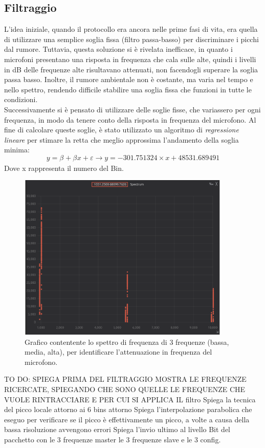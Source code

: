 \subsection{Filtraggio}
L'idea iniziale, quando il protocollo era ancora nelle prime fasi di vita, era quella di utilizzare una semplice soglia fissa (filtro passa-basso) per discriminare i picchi dal rumore.
Tuttavia, questa soluzione si è rivelata inefficace, in quanto i microfoni presentano una risposta in frequenza che cala sulle alte, quindi i livelli in dB delle frequenze alte risultavano attenuati, non facendogli superare la soglia passa basso.
Inoltre, il rumore ambientale non è costante, ma varia nel tempo e nello spettro, rendendo difficile stabilire una soglia fissa che funzioni in tutte le condizioni.\\ 
Successivamente si è pensato di utilizzare delle soglie fisse, che variassero per ogni frequenza, in modo da tenere conto della risposta in frequenza del microfono.
Al fine di calcolare queste soglie, è stato utilizzato un algoritmo di \textit{regressione lineare} per stimare la retta che meglio approssima l'andamento della soglia minima:
\[
y = \beta_{} + \beta_{}x + \varepsilon \rightarrow y = -301.751324 \times x + 48531.689491
\]
Dove x rappresenta il numero del Bin.
\begin{figure}[H]
    \centering
    \includegraphics[width=0.9\textwidth]{immagini/fft_regression_check.png}
    \caption{Grafico contentente lo spettro di frequenza di 3 frequenze (bassa, media, alta), per identificare l'attenuazione in frequenza del microfono.}
    \label{fig:spettro2}
\end{figure}


TO DO:
SPIEGA PRIMA DEL FILTRAGGIO MOSTRA LE FREQUENZE RICERCATE, SPIEGANDO CHE SONO QUELLE LE FREQUENZE CHE VUOLE RINTRACCIARE E PER CUI SI APPLICA IL filtro
Spiega la tecnica del picco locale attorno ai 6 bins attorno
Spiega l'interpolazione parabolica che eseguo per verificare se il picco è effettivamente un picco, a volte a causa della bassa risoluzione avvengono errori
Spiega l'invio ultimo al livello Bit del pacchetto con le 3 frequenze master le 3 frequenze slave e le 3 config. 